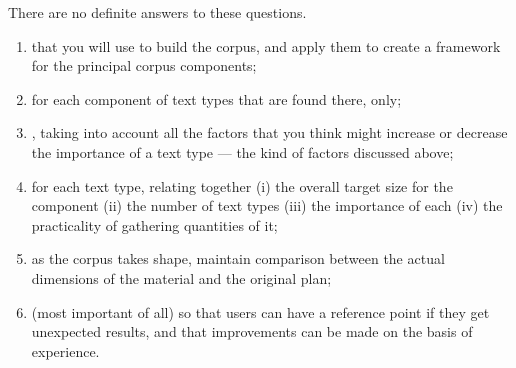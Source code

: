 \documentclass[a4paper,landscape,headrule,footrule,xetex]{foils}
\begin{document}
There are no definite answers to these questions.


\begin{enumerate}
\item {} that you will use to build the corpus, and apply them to create a framework for the principal corpus components;
\item for each component  of text types that are found there,  only;
\item {}, taking into account all the factors that you think might increase or decrease the importance of a text type — the kind of factors discussed above;
\item {} for each text type, relating together (i) the overall target size for the component (ii) the number of text types (iii) the importance of each (iv) the practicality of gathering quantities of it;
\item as the corpus takes shape, maintain comparison between the actual dimensions of the material and the original plan;
\item (most important of all)  so that users can have a reference point if they get unexpected results, and that improvements can be made on the basis of experience.
\end{enumerate}

\end{document}
